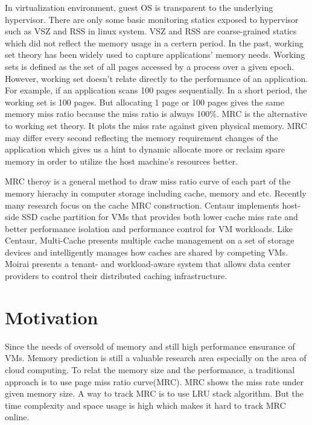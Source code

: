 \documentclass[10pt,twocolumn]{article}
\begin{document}
In virtualization environment, guest OS is transparent to the underlying hypervisor. There are only some basic monitoring statics exposed to hypervisor such as VSZ and RSS in linux system. VSZ and RSS are coarse-grained statics which did not reflect the memory usage in a certern period. In the past, working set theory\cite{wss} has been widely used to capture applications' memory needs. Working sets is defined as the set of all pages accessed by a process over a given epoch. However, working set doesn't relate directly to the performance of an application. For example, if an application scans 100 pages sequentially. In a short period, the working set is 100 pages. But allocating 1 page or 100 pages gives the same memory miss ratio because the miss ratio is always 100\%. MRC is the alternative to working set theory. It plots the miss rate against given physical memory. MRC may differ every second reflecting the memory requirement changes of the application which gives us a hint to dynamic allocate more or reclaim spare memory in order to utilize the host machine's resources better.

MRC theroy is a general method to draw miss ratio curve of each part of the memory hierachy in computer storage including cache, memory and etc. Recently many research focus on the cache MRC construction. Centaur\cite{Koller2015Centaur} implements host-side SSD cache partition for VMs that provides both lower cache miss rate and better performance isolation and performance control for VM workloads. Like Centaur, Multi-Cache\cite{Rajasekaran2016Multi} presents multiple cache management on a set of storage devices and intelligently manages how caches are shared by competing VMs. Moirai\cite{Stefanovici2015Software} presents a tenant- and workload-aware system that allows data center providers to control their distributed caching infrastructure. 



\section{Motivation}
Since the needs of oversold of memory and still high performance ensurance of VMs. Memory prediction is still a valuable research area especially on the area of cloud computing. To relat the memory size and the performance, a traditional approach is to use page miss ratio curve(MRC). MRC shows the miss rate under given memory size. A way to track MRC is to use LRU stack algorithm\cite{Mattson1970Evaluation}. But the time complexity and space usage is high which makes it hard to track MRC online.
\end{document}
